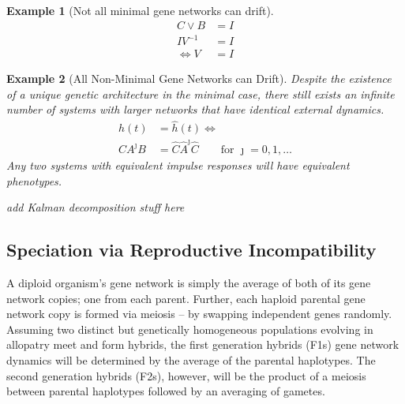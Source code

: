 \documentclass[9 pt]{article}
\newcommand{\plr}[1]{{\color{blue}\it #1}}
\newcommand{\1}{\mathbbm{1}}
\newtheorem{example}{Example}
\begin{document}
\begin{multicols}{2}
\begin{example}[Not all minimal gene networks can drift]
     \begin{align}
        C \lor B &= I \\
        IV^{-1} &= I \\
        \iff V &= I
      \end{align}
      \end{example}
      \begin{example}[All Non-Minimal Gene Networks can Drift]
      
      Despite the existence of a unique genetic architecture in the minimal case, there still exists an infinite number of systems with larger networks that have identical external dynamics. 
      \begin{align}
        h(t) &= \widehat{h}(t) \iff \\ 
        CA^{\jmath}B &= \widehat{C} \widehat{A}^{\jmath} \widehat{C} \qquad \text{for } \jmath = 0, 1, \dots
      \end{align}
      Any two systems with equivalent impulse responses will have equivalent phenotypes.
      \end{example}

      \plr{add Kalman decomposition stuff here}

      \subsection*{Speciation via Reproductive Incompatibility}


      A diploid organism's gene network is simply the average of both of its gene network copies; one from each parent. Further, each haploid parental gene network copy is formed via meiosis -- by swapping independent genes randomly. Assuming two distinct but genetically homogeneous populations evolving in allopatry meet and form hybrids, the first generation hybrids (F1s) gene network dynamics will be determined by the average of the parental haplotypes. The second generation hybrids (F2s), however, will be the product of a meiosis between parental haplotypes followed by an averaging of gametes. 


\end{multicols}
\end{document}
